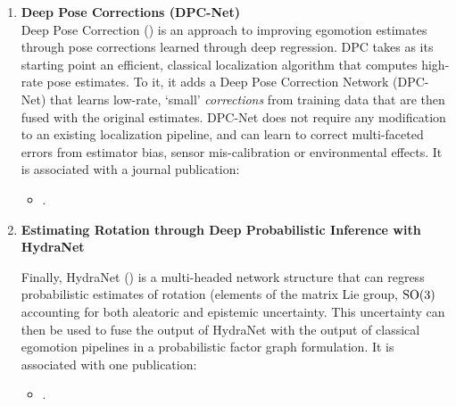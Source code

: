 \begin{enumerate}
\item \textbf{Deep Pose Corrections (DPC-Net)} \\
Deep Pose Correction () is an approach to improving egomotion estimates through pose corrections learned through deep regression. DPC takes as its starting point an efficient, classical localization algorithm that computes high-rate pose estimates. To it, it adds a Deep Pose Correction Network (DPC-Net) that learns low-rate, `small' \textit{corrections} from training data that are then fused with the original estimates. DPC-Net does not require any modification to an existing localization pipeline, and can learn to correct multi-faceted errors from estimator bias, sensor mis-calibration or environmental effects. It is associated with a journal publication:
\begin{itemize}
\item {}.
\end{itemize}

\item \textbf{Estimating Rotation through Deep Probabilistic Inference with HydraNet}

Finally, HydraNet () is a multi-headed network structure that can regress probabilistic estimates of rotation (elements of the matrix Lie group, $\mathrm{SO}(3)$ accounting for both aleatoric and epistemic uncertainty. This uncertainty can then be used to fuse the output of HydraNet with the output of classical egomotion pipelines in a probabilistic factor graph formulation. It is associated with one publication:

\begin{itemize}
\item {}.
\end{itemize}


\end{enumerate}

%







